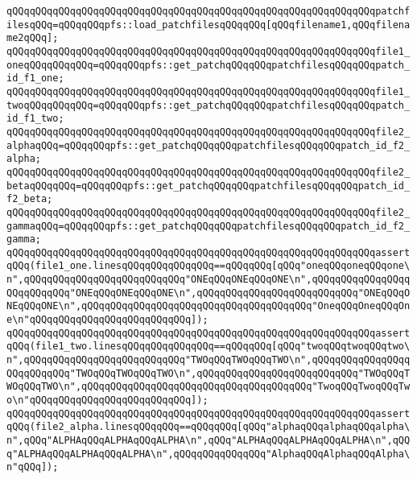 \newline
\verb|qQQqqQQqqQQqqQQqqQQqqQQqqQQqqQQqqQQqqQQqqQQqqQQqqQQqqQQqqQQqqQQqpatchfilesqQQq=qQQqqQQqpfs::load_patchfilesqQQqqQQq[qQQqfilename1,qQQqfilename2qQQq];|\newline
\newline
\verb|qQQqqQQqqQQqqQQqqQQqqQQqqQQqqQQqqQQqqQQqqQQqqQQqqQQqqQQqqQQqqQQqfile1_oneqQQqqQQqqQQq=qQQqqQQqpfs::get_patchqQQqqQQqpatchfilesqQQqqQQqpatch_id_f1_one;|\newline
\verb|qQQqqQQqqQQqqQQqqQQqqQQqqQQqqQQqqQQqqQQqqQQqqQQqqQQqqQQqqQQqqQQqfile1_twoqQQqqQQqqQQq=qQQqqQQqpfs::get_patchqQQqqQQqpatchfilesqQQqqQQqpatch_id_f1_two;|\newline
\newline
\verb|qQQqqQQqqQQqqQQqqQQqqQQqqQQqqQQqqQQqqQQqqQQqqQQqqQQqqQQqqQQqqQQqfile2_alphaqQQq=qQQqqQQqpfs::get_patchqQQqqQQqpatchfilesqQQqqQQqpatch_id_f2_alpha;|\newline
\verb|qQQqqQQqqQQqqQQqqQQqqQQqqQQqqQQqqQQqqQQqqQQqqQQqqQQqqQQqqQQqqQQqfile2_betaqQQqqQQq=qQQqqQQqpfs::get_patchqQQqqQQqpatchfilesqQQqqQQqpatch_id_f2_beta;|\newline
\verb|qQQqqQQqqQQqqQQqqQQqqQQqqQQqqQQqqQQqqQQqqQQqqQQqqQQqqQQqqQQqqQQqfile2_gammaqQQq=qQQqqQQqpfs::get_patchqQQqqQQqpatchfilesqQQqqQQqpatch_id_f2_gamma;|\newline
\newline
\verb|qQQqqQQqqQQqqQQqqQQqqQQqqQQqqQQqqQQqqQQqqQQqqQQqqQQqqQQqqQQqqQQqassertqQQq(file1_one.linesqQQqqQQqqQQqqQQq==qQQqqQQq[qQQq"oneqQQqoneqQQqone\n",qQQqqQQqqQQqqQQqqQQqqQQqqQQq"ONEqQQqONEqQQqONE\n",qQQqqQQqqQQqqQQqqQQqqQQqqQQq"ONEqQQqONEqQQqONE\n",qQQqqQQqqQQqqQQqqQQqqQQqqQQq"ONEqQQqONEqQQqONE\n",qQQqqQQqqQQqqQQqqQQqqQQqqQQqqQQqqQQqqQQq"OneqQQqOneqQQqOne\n"qQQqqQQqqQQqqQQqqQQqqQQqqQQq]);|\newline
\verb|qQQqqQQqqQQqqQQqqQQqqQQqqQQqqQQqqQQqqQQqqQQqqQQqqQQqqQQqqQQqqQQqassertqQQq(file1_two.linesqQQqqQQqqQQqqQQq==qQQqqQQq[qQQq"twoqQQqtwoqQQqtwo\n",qQQqqQQqqQQqqQQqqQQqqQQqqQQq"TWOqQQqTWOqQQqTWO\n",qQQqqQQqqQQqqQQqqQQqqQQqqQQq"TWOqQQqTWOqQQqTWO\n",qQQqqQQqqQQqqQQqqQQqqQQqqQQq"TWOqQQqTWOqQQqTWO\n",qQQqqQQqqQQqqQQqqQQqqQQqqQQqqQQqqQQqqQQq"TwoqQQqTwoqQQqTwo\n"qQQqqQQqqQQqqQQqqQQqqQQqqQQq]);|\newline
\newline
\verb|qQQqqQQqqQQqqQQqqQQqqQQqqQQqqQQqqQQqqQQqqQQqqQQqqQQqqQQqqQQqqQQqassertqQQq(file2_alpha.linesqQQqqQQq==qQQqqQQq[qQQq"alphaqQQqalphaqQQqalpha\n",qQQq"ALPHAqQQqALPHAqQQqALPHA\n",qQQq"ALPHAqQQqALPHAqQQqALPHA\n",qQQq"ALPHAqQQqALPHAqQQqALPHA\n",qQQqqQQqqQQqqQQq"AlphaqQQqAlphaqQQqAlpha\n"qQQq]);|\newline
